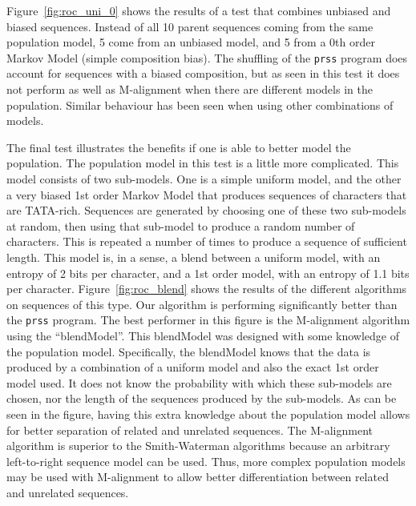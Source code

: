 \documentclass[letterpaper,11pt,oneside]{article}
\begin{document}
\begin{multicols}{2}
Figure~\ref{fig:roc_uni_0} shows the results of a test that combines unbiased
and biased sequences.  Instead of all 10 parent sequences coming from the same
population model, 5 come from an unbiased model, and 5 from a 0th order Markov
Model (simple composition bias).  The shuffling of the \verb!prss! program
does account for sequences with a biased composition, but as seen in this test
it does not perform as well as M-alignment when there are different models in
the population.  Similar behaviour has been seen when using other combinations
of models.


The final test illustrates the benefits if one is able to better model the
population.  The population model in this test is a little more complicated.
This model consists of two sub-models.  One is a simple uniform model, and the
other a very biased 1st order Markov Model that produces sequences of
characters that are TATA-rich.  Sequences are generated by
choosing one of these two sub-models at random, then using that sub-model to
produce a random number of characters.  This is repeated a number of times to
produce a sequence of sufficient length.  This model is, in a sense, a blend
between a uniform model, with an entropy of 2 bits per character, and a 1st
order model, with an entropy of 1.1 bits per character.
Figure~\ref{fig:roc_blend} shows the results of the different algorithms on
sequences of this type.  Our algorithm is performing significantly better than
the \verb!prss! program.  The best performer in this figure is the M-alignment
algorithm using the ``blendModel''.  This blendModel was designed with some
knowledge of the population model.  Specifically, the blendModel knows that
the data is produced by a combination of a uniform model and also the exact
1st order model used.  It does not know the probability with which these
sub-models are chosen, nor the length of the sequences produced by the
sub-models.  As can be seen in the figure, having this extra knowledge about
the population model allows for better separation of related and unrelated
sequences.  The M-alignment algorithm is superior to the Smith-Waterman
algorithms because an arbitrary left-to-right sequence model can be used.
Thus, more complex population models may be used with M-alignment to allow
better differentiation between related and unrelated sequences.



\end{multicols}
\end{document}
